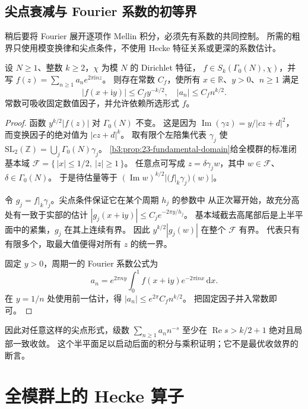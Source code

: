 \subsection{尖点衰减与 Fourier 系数的初等界}
\label{b3:subsec:E0104}

稍后要将 Fourier 展开逐项作 Mellin 积分，必须先有系数的共同控制。
所需的粗界只使用模变换律和尖点条件，不使用 Hecke 特征关系或更深的系数估计。

\begin{proposition}[尖点形式的增长界]\label{b3:prop:E-coefficient-growth}
设 \(N\ge1\)、整数 \(k\ge2\)，\(\chi\) 为模 \(N\) 的 Dirichlet 特征，
\(f\in S_k(\Gamma_0(N),\chi)\)，并写
\(f(z)=\sum_{n\ge1}a_ne^{2\pi\mathrm i nz}\)。
则存在常数 \(C_f\)，使所有 \(x\in\mathbb R\)、\(y>0\)、\(n\ge1\) 满足
\[
 |f(x+\mathrm i y)|\le C_f y^{-k/2},\quad |a_n|\le C_f n^{k/2}.
\]
常数可吸收固定数值因子，并允许依赖所选形式 \(f\)。
\end{proposition}
\begin{proof}
函数 \(y^{k/2}|f(z)|\) 对 \(\Gamma_0(N)\) 不变。
这是因为 \(\operatorname{Im}(\gamma z)=y/|cz+d|^2\)，
而变换因子的绝对值为 \(|cz+d|^k\)。
取有限个左陪集代表 \(\gamma_j\) 使
\(\mathrm{SL}_2(\mathbb Z)=\bigcup_j\Gamma_0(N)\gamma_j\)。
\cref{b3:prop:23-fundamental-domain}给全模群的标准闭基本域
\(\mathcal F=\{\,|x|\le1/2,\ |z|\ge1\,\}\)。
任意点可写成 \(z=\delta\gamma_j w\)，其中 \(w\in\mathcal F\)、\(\delta\in\Gamma_0(N)\)。
于是待估量等于
\((\operatorname{Im}w)^{k/2}|(f|_k\gamma_j)(w)|\)。

令 \(g_j=f|_k\gamma_j\)。尖点条件保证它在某个周期 \(h_j\) 的参数中
从正次幂开始，故充分高处有一致于实部的估计
\(|g_j(x+\mathrm i y)|\le C_j e^{-2\pi y/h_j}\)。
基本域截去高尾部后是上半平面中的紧集，\(g_j\) 在其上连续有界。
因此 \(y^{k/2}|g_j(w)|\) 在整个 \(\mathcal F\) 有界。
代表只有有限多个，取最大值便得对所有 \(z\) 的统一界。

固定 \(y>0\)，周期一的 Fourier 系数公式为
\[
 a_n=e^{2\pi ny}\int_0^1 f(x+\mathrm i y)e^{-2\pi\mathrm i nx}\,\mathrm dx.
\]
在 \(y=1/n\) 处使用前一估计，得 \(|a_n|\le e^{2\pi}C_f n^{k/2}\)。
把固定因子并入常数即可。
\end{proof}
因此对任意这样的尖点形式，级数 \(\sum_{n\ge1}a_nn^{-s}\)
至少在 \(\operatorname{Re}s>k/2+1\) 绝对且局部一致收敛。
这个半平面足以启动后面的积分与乘积证明；它不是最优收敛界的断言。

\section{全模群上的 Hecke 算子}
\label{b3:sec:E02}

